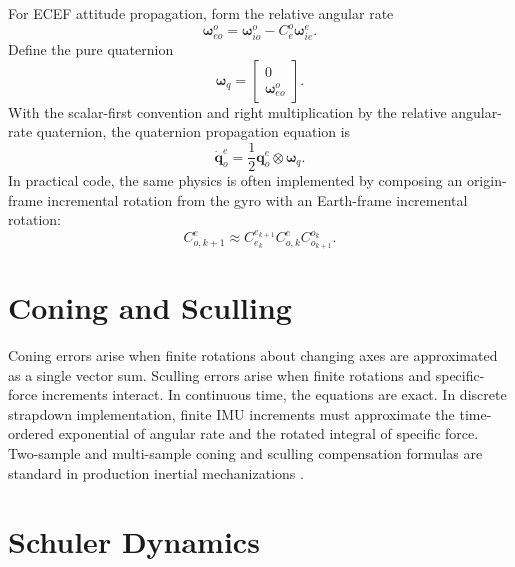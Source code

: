 \documentclass[11pt,oneside]{book}
\begin{document}
For ECEF attitude propagation, form the relative angular rate
\begin{equation}
\boldsymbol{\omega}_{eo}^{o}
=
\boldsymbol{\omega}_{io}^{o}
-
C_e^o\boldsymbol{\omega}_{ie}^{e}.
\end{equation}
Define the pure quaternion
\begin{equation}
\boldsymbol{\omega}_{q}
=
\begin{bmatrix}
0\\
\boldsymbol{\omega}_{eo}^{o}
\end{bmatrix}.
\end{equation}
With the scalar-first convention and right multiplication by the relative angular-rate quaternion, the quaternion propagation equation is
\begin{equation}
\boxed{
\dot{\mathbf{q}}_{o}^{e}
=
\frac{1}{2}
\mathbf{q}_{o}^{e}
\otimes
\boldsymbol{\omega}_{q}.
}
\label{eq:quat_origin_to_ecef}
\end{equation}
In practical code, the same physics is often implemented by composing an origin-frame incremental rotation from the gyro with an Earth-frame incremental rotation:
\begin{equation}
C_{o,k+1}^{e}
\approx
C_{e_k}^{e_{k+1}}
C_{o,k}^{e}
C_{o_{k+1}}^{o_k}.
\end{equation}

\section{Coning and Sculling}

Coning errors arise when finite rotations about changing axes are approximated as a single vector sum. Sculling errors arise when finite rotations and specific-force increments interact. In continuous time, the equations are exact. In discrete strapdown implementation, finite IMU increments must approximate the time-ordered exponential of angular rate and the rotated integral of specific force. Two-sample and multi-sample coning and sculling compensation formulas are standard in production inertial mechanizations \cite{titterton2004,groves2013}.

\section{Schuler Dynamics}
\end{document}
